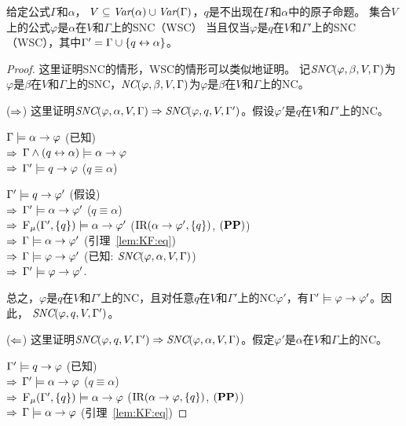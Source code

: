 \begin{proposition}\label{formulaNS_to_p}
	给定公式$\Gamma$和$\alpha$， $V \subseteq \textit{Var}(\alpha) \cup \textit{Var}(\Gamma)$，$q$是不出现在$\Gamma$和$\alpha$中的原子命题。
	集合$V$上的公式$\varphi$是$\alpha$在$V$和$\Gamma$上的SNC（WSC） 当且仅当$\varphi$是$q$在$V$和$\Gamma'$上的SNC（WSC），其中$\Gamma' = \Gamma \cup \{q \leftrightarrow \alpha\}$。
\end{proposition}
\begin{proof}
	这里证明SNC的情形，WSC的情形可以类似地证明。
	记$\emph{SNC}(\varphi,\beta,V,\Gamma)$为$\varphi$是$\beta$在$V$和$\Gamma$上的SNC，$\emph{NC}(\varphi,\beta,V,\Gamma)$为$\varphi$是$\beta$在$V$和$\Gamma$上的NC。
	
	($\Rightarrow$) 这里证明$\emph{SNC}(\varphi,\alpha,V,\Gamma)\Rightarrow \emph{SNC}(\varphi,q,V,\Gamma')$。假设$\varphi'$是$q$在$V$和$\Gamma'$上的NC。
	
	$\Gamma \models \alpha \rightarrow \varphi$ \hfill  (已知)\\
	$\Rightarrow$ $\Gamma \wedge (q \leftrightarrow \alpha) \models \alpha \rightarrow \varphi$\\
	$\Rightarrow$ $\Gamma' \models q \rightarrow \varphi$  \hfill ($q \equiv \alpha$)
	
	$\Gamma' \models q \rightarrow \varphi'$ \hfill (假设) \\
	$\Rightarrow$ $\Gamma' \models \alpha \rightarrow \varphi'$ \hfill ($q \equiv \alpha$)\\
	$\Rightarrow$ ${\textsc{F}_{\textsc{$\mu$}}}(\Gamma', \{q\}) \models \alpha \rightarrow \varphi'$ \hfill ($\textrm{IR}(\alpha \rightarrow \varphi', \{q\})$, $(\textbf{PP})$)\\
	$\Rightarrow$ $\Gamma \models \alpha \rightarrow \varphi'$ \hfill  (引理~\ref{lem:KF:eq})\\
	$\Rightarrow$ $\Gamma \models \varphi \rightarrow \varphi'$ \hfill  (已知: $\emph{SNC}(\varphi,\alpha,V,\Gamma)$)\\
	$\Rightarrow$ $\Gamma' \models \varphi \rightarrow \varphi'$.
	
	总之，$\varphi$是$q$在$V$和$\Gamma'$上的NC，且对任意$q$在$V$和$\Gamma'$上的NC$\varphi'$，有$\Gamma' \models \varphi \rightarrow \varphi'$。因此， $\emph{SNC}(\varphi,q,V,\Gamma')$。
	
	($\Leftarrow$) 这里证明$\emph{SNC}(\varphi,q,V,\Gamma')\Rightarrow \emph{SNC}(\varphi,\alpha,V,\Gamma)$。假定$\varphi'$是$\alpha$在$V$和$\Gamma$上的NC。
	
	$\Gamma' \models q \rightarrow \varphi$ \hfill  (已知)\\
	$\Rightarrow$  $\Gamma' \models \alpha \rightarrow \varphi$ \hfill  ($q \equiv \alpha$)\\
	$\Rightarrow$  ${\textsc{F}_{\textsc{$\mu$}}}(\Gamma', \{q\}) \models \alpha \rightarrow \varphi$ \hfill ($\textrm{IR}(\alpha \rightarrow \varphi, \{q\})$, $(\textbf{PP})$)\\
	$\Rightarrow$ $\Gamma \models \alpha \rightarrow \varphi$ \hfill  (引理~\ref{lem:KF:eq})
	

\end{proof}
